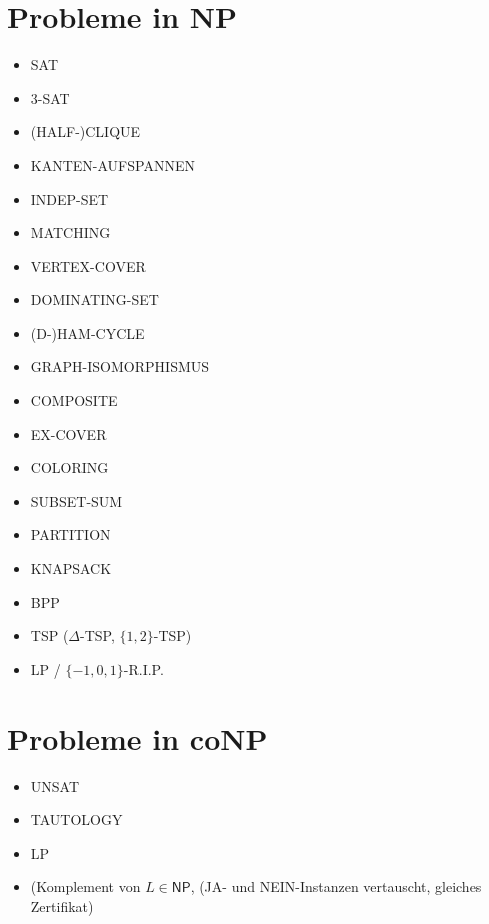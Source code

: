 \documentclass[a4paper,graphics,11pt]{article}
\begin{document}
\begin{minipage}{.5\textwidth}
\section*{Probleme in \textsf{NP}}

\begin{itemize}
    \item SAT
    \item 3-SAT
    \item (HALF-)CLIQUE
    \item KANTEN-AUFSPANNEN
    \item INDEP-SET
    \item MATCHING
    \item VERTEX-COVER
    \item DOMINATING-SET
    \item (D-)HAM-CYCLE
    \item GRAPH-ISOMORPHISMUS
    \item COMPOSITE
    \item EX-COVER
    \item COLORING
    \item SUBSET-SUM
    \item PARTITION
    \item KNAPSACK
    \item BPP
    \item TSP ($\Delta$-TSP, $\{1,2\}$-TSP)
    \item LP / $\{-1,0,1\}$-R.I.P.
\end{itemize}
\end{minipage}
\begin{minipage}{.5\textwidth}
    \section*{Probleme in \textsf{coNP}}

    \begin{itemize}
        \item UNSAT
        \item TAUTOLOGY
        \item LP
        \item (Komplement von $L \in \textsf{NP}$, (JA- und NEIN-Instanzen vertauscht, gleiches Zertifikat)
    \end{itemize}

\end{minipage}

\newpage
\end{document}
